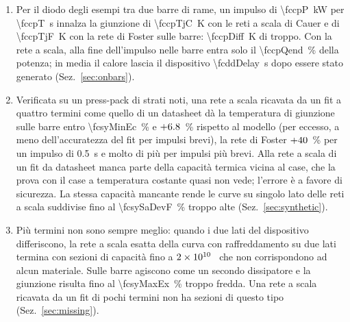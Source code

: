 \documentclass[10pt,a4paper]{scrartcl}
\let\newcommand\fcitdefine
\newcommand{\JK}{\si{\joule\per\kelvin}}
\begin{document}
\begin{enumerate}
\item Per il diodo degli esempi tra due barre di rame, un impulso di \SI{\fccpP}{\kilo\watt} per \SI{\fccpT}{\second} innalza la giunzione di \SI{\fccpTjC}{\kelvin} con le reti a scala di Cauer e di \SI{\fccpTjF}{\kelvin} con la rete di Foster sulle barre: \SI{\fccpDiff}{\kelvin} di troppo. Con la rete a scala, alla fine dell'impulso nelle barre entra solo il \SI{\fccpQend}{\percent} della potenza; in media il calore lascia il dispositivo \SI{\fcddDelay}{\second} dopo essere stato generato (Sez.~\ref{sec:onbars}).
\item Verificata su un press-pack di strati noti, una rete a scala ricavata da un fit a quattro termini come quello di un datasheet dà la temperatura di giunzione sulle barre entro \SI{\fcsyMinEc}{\percent} e $+6.8$~\% rispetto al modello (per eccesso, a meno dell'accuratezza del fit per impulsi brevi), la rete di Foster $+40$~\% per un impulso di \SI{0.5}{\second} e molto di più per impulsi più brevi. Alla rete a scala di un fit da datasheet manca parte della capacità termica vicina al case, che la prova con il case a temperatura costante quasi non vede; l'errore è a favore di sicurezza. La stessa capacità mancante rende le curve su singolo lato delle reti a scala suddivise fino al \SI{\fcsySaDevF}{\percent} troppo alte (Sez.~\ref{sec:synthetic}).
\item Più termini non sono sempre meglio: quando i due lati del dispositivo differiscono, la rete a scala esatta della curva con raffreddamento su due lati termina con sezioni di capacità fino a $2\times 10^{10}$~\JK{} che non corrispondono ad alcun materiale. Sulle barre agiscono come un secondo dissipatore e la giunzione risulta fino al \SI{\fcsyMaxEx}{\percent} troppo fredda. Una rete a scala ricavata da un fit di pochi termini non ha sezioni di questo tipo (Sez.~\ref{sec:missing}).
\end{enumerate}

\end{document}
